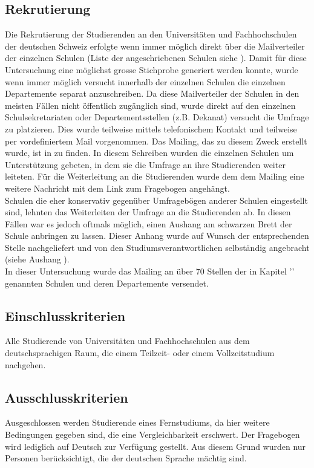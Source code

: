 \subsection{Rekrutierung}\label{subsection.rekrutierung}
Die Rekrutierung der Studierenden an den Universitäten und Fachhochschulen der deutschen Schweiz erfolgte wenn immer möglich direkt über die Mailverteiler der einzelnen Schulen (Liste der angeschriebenen Schulen siehe ). Damit für diese Untersuchung eine möglichst grosse Stichprobe generiert werden konnte, wurde wenn immer möglich versucht innerhalb der einzelnen Schulen die einzelnen Departemente separat anzuschreiben. Da diese Mailverteiler der Schulen in den meisten Fällen nicht öffentlich zugänglich sind, wurde direkt auf den einzelnen Schulsekretariaten oder Departementsstellen (z.B. Dekanat) versucht die Umfrage zu platzieren. Dies wurde teilweise mittels telefonischem Kontakt und teilweise per vordefiniertem Mail vorgenommen. Das Mailing, das zu diesem Zweck erstellt wurde, ist in  zu finden. In diesem Schreiben wurden die einzelnen Schulen um Unterstützung gebeten, in dem sie die Umfrage an ihre Studierenden weiter leiteten. Für die Weiterleitung an die Studierenden wurde dem dem Mailing eine weitere Nachricht mit dem Link zum Fragebogen angehängt. \\
Schulen die eher konservativ gegenüber Umfragebögen anderer Schulen eingestellt sind, lehnten das Weiterleiten der Umfrage an die Studierenden ab. In diesen Fällen war es jedoch oftmals möglich, einen Aushang am schwarzen Brett der Schule anbringen zu lassen. Dieser Anhang wurde auf Wunsch der entsprechenden Stelle nachgeliefert und von den Studiumsverantwortlichen selbständig angebracht (siehe Aushang ). \\
In dieser Untersuchung wurde das Mailing an über 70 Stellen der in Kapitel '' genannten Schulen und deren Departemente versendet.
\subsection{Einschlusskriterien}\label{subsection.einschlusskriterien}
Alle Studierende von Universitäten und Fachhochschulen aus dem deutschsprachigen Raum, die einem Teilzeit- oder einem Vollzeitstudium nachgehen.
\subsection{Ausschlusskriterien}\label{subsection.ausschlusskriterien}
Ausgeschlossen werden Studierende eines Fernstudiums, da hier weitere Bedingungen gegeben sind, die eine Vergleichbarkeit erschwert. Der Fragebogen wird lediglich auf Deutsch zur Verfügung gestellt. Aus diesem Grund wurden nur Personen berücksichtigt, die der deutschen Sprache mächtig sind. 


